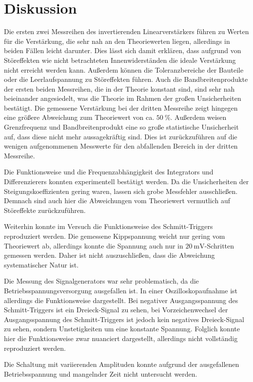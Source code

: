 \section{Diskussion}
Die ersten zwei Messreihen des invertierenden Linearverstärkers führen zu Werten für die Verstärkung, die sehr nah an den Theoriewerten liegen, allerdings in beiden Fällen leicht darunter. Dies lässt sich damit erklären, dass aufgrund von Störeffekten wie nicht betrachteten Innenwiderständen die ideale Verstärkung nicht erreicht werden kann. Außerdem können die Toleranzbereiche der Bauteile oder die Leerlaufspannung zu Störeffekten führen. Auch die Bandbreitenprodukte der ersten beiden Messreihen, die in der Theorie konstant sind, sind sehr nah beieinander angesiedelt, was die Theorie im Rahmen der großen Unsicherheiten bestätigt. Die gemessene Verstärkung bei der dritten Messreihe zeigt hingegen eine größere Abweichung zum Theoriewert von ca. $\SI{50}{\percent}$. Außerdem weisen Grenzfrequenz und Bandbreitenprodukt eine so große statistische Unsicherheit auf, dass diese nicht mehr aussagekräftig sind. Dies ist zurückzuführen auf die wenigen aufgenommenen Messwerte für den abfallenden Bereich in der dritten Messreihe.

Die Funktionsweise und die Frequenzabhängigkeit des Integrators und Differenzierers konnten experimentell bestätigt werden. Da die Unsicherheiten der Steigungskoeffizienten gering waren, lassen sich grobe Messfehler ausschließen. Demnach sind auch hier die Abweichungen vom Theoriewert vermutlich auf Störeffekte zurückzuführen.

Weiterhin konnte im Versuch die Funktionsweise des Schmitt-Triggers reproduziert werden. Die gemessene Kippspannung weicht nur gering vom Theoriewert ab, allerdings konnte die Spannung auch nur in $\SI{20}{\milli\volt}$-Schritten gemessen werden. Daher ist nicht auszuschließen, dass die Abweichung systematischer Natur ist.

Die Messung des Signalgenerators war sehr problematisch, da die Betriebsspannungsversorgung ausgefallen ist. In einer Oszilloskopaufnahme ist allerdings die Funktionsweise dargestellt. Bei negativer Ausgangsspannung des Schmitt-Triggers ist ein Dreieck-Signal zu sehen, bei Vorzeichenwechsel der Ausgangsspannung des Schmitt-Triggers ist jedoch kein negatives Dreieck-Signal zu sehen, sondern Unstetigkeiten um eine konstante Spannung. Folglich konnte hier die Funktionsweise zwar nuanciert dargestellt, allerdings nicht vollständig reproduziert werden.

Die Schaltung mit variierenden Amplituden konnte aufgrund der ausgefallenen Betriebsspannung und mangelnder Zeit nicht untersucht werden.
